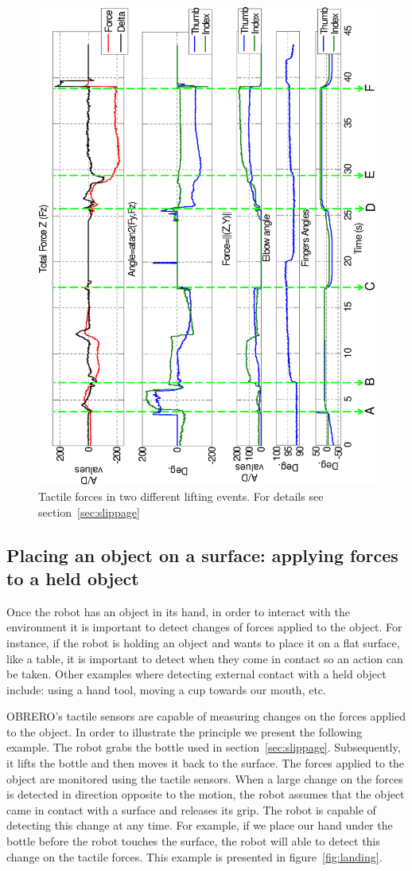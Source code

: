 \begin{figure}[htbp]
\centerline{
\includegraphics[height=\textwidth, angle=270 ]{./figures/ThesisSlipX.eps}
} \caption[Tactile forces when lifting an object]{Tactile forces
in two different lifting events. For details see
section~\ref{sec:slippage} } \label{fig:slip}
\end{figure}



\subsection{Placing an object on a surface: applying forces to a held object}

Once the robot has an object in its hand, in order to interact
with the environment it is important to detect changes of forces
applied to the object. For instance, if the robot is holding an
object and wants to place it on a flat surface, like a table, it
is important to detect when they come in contact so an action can
be taken. Other examples where detecting external contact with a
held object include: using a hand tool, moving a cup towards our
mouth, etc.

OBRERO's tactile sensors are capable of measuring changes on the
forces applied to the object. In order to illustrate the principle
we present the following example. The robot grabs the bottle used
in section~\ref{sec:slippage}. Subsequently, it lifts the bottle
and then moves it back to the surface. The forces applied to the
object are monitored using the tactile sensors. When a large
change on the forces is detected in direction opposite to the
motion, the robot assumes that the object came in contact with a
surface and releases its grip. The robot is capable of detecting
this change at any time. For example, if we place our hand under
the bottle before the robot touches the surface, the robot will
able to detect this change on the tactile forces. This example is
presented in figure~\ref{fig:landing}.


